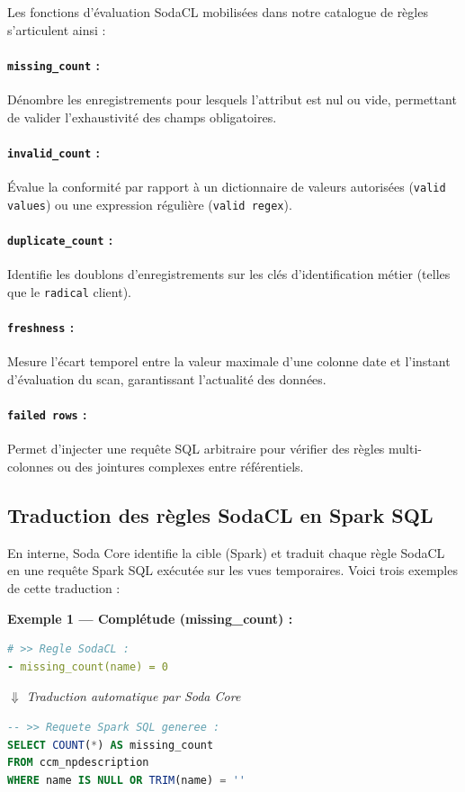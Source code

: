 Les fonctions d'évaluation SodaCL mobilisées dans notre catalogue de règles s'articulent ainsi :

\paragraph{\texttt{missing\_count} :} Dénombre les enregistrements pour lesquels l'attribut est nul ou vide, permettant de valider l'exhaustivité des champs obligatoires.

\paragraph{\texttt{invalid\_count} :} Évalue la conformité par rapport à un dictionnaire de valeurs autorisées (\texttt{valid values}) ou une expression régulière (\texttt{valid regex}).

\paragraph{\texttt{duplicate\_count} :} Identifie les doublons d'enregistrements sur les clés d'identification métier (telles que le \texttt{radical} client).

\paragraph{\texttt{freshness} :} Mesure l'écart temporel entre la valeur maximale d'une colonne date et l'instant d'évaluation du scan, garantissant l'actualité des données.

\paragraph{\texttt{failed rows} :} Permet d'injecter une requête SQL arbitraire pour vérifier des règles multi-colonnes ou des jointures complexes entre référentiels.

\subsection{Traduction des règles SodaCL en Spark SQL}

En interne, Soda Core identifie la cible (Spark) et traduit chaque règle SodaCL en une requête Spark SQL exécutée sur les vues temporaires. Voici trois exemples de cette traduction :

\medskip
\noindent\textbf{Exemple 1 — Complétude (missing\_count) :}
\begin{lstlisting}[language=YAML]
# >> Regle SodaCL :
- missing_count(name) = 0
\end{lstlisting}
\begin{center}$\Downarrow$ \textit{Traduction automatique par Soda Core}\end{center}
\begin{lstlisting}[language=SQL]
-- >> Requete Spark SQL generee :
SELECT COUNT(*) AS missing_count
FROM ccm_npdescription
WHERE name IS NULL OR TRIM(name) = ''
\end{lstlisting}

